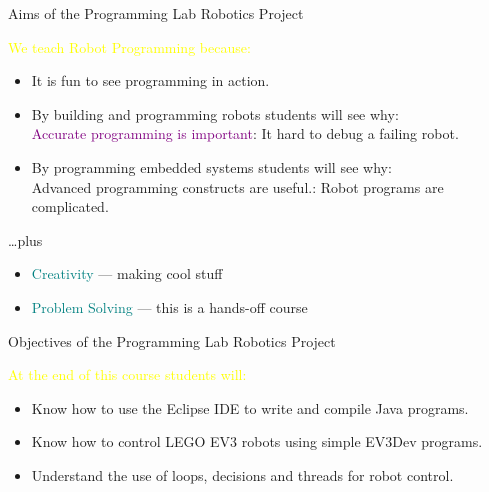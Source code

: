 \documentclass[color=pdftex,usenames,dvipsnames, aspectratio=169]{beamer}
\begin{document}



\begin{frame}{Aims of the Programming Lab Robotics Project }
\begin{block}{\textcolor{yellow}{We teach Robot Programming because:}}
\begin{itemize}
\item It is fun to see programming in action.
\item By building and programming robots students will see why: \\
\textcolor{purple}{Accurate programming is important}: It hard to debug a failing robot.
\item By programming embedded systems students will see why:\\
\textcolor{OliveGreen}{Advanced programming constructs are useful.}: Robot programs are complicated.
\end{itemize}
\end{block}
\pause
\begin{block}{\dots plus}
\begin{itemize}
\item \textcolor{teal}{Creativity} --- making cool stuff
\item \textcolor{teal}{Problem Solving} --- this is a hands-off course
\end{itemize}
\end{block}
\end{frame}

\begin{frame}{Objectives of the Programming Lab Robotics Project}
\begin{block}{\textcolor{yellow}{At the end of this course students will:}}
\begin{itemize}
\item Know how to \alert{use the Eclipse IDE} to write and compile Java programs.
\item Know how to \alert{control LEGO EV3 robots} using simple EV3Dev programs.
\item Understand the use of \alert{loops, decisions and threads for robot control}.
\end{itemize}
\end{block}
\end{frame}
\end{document}
